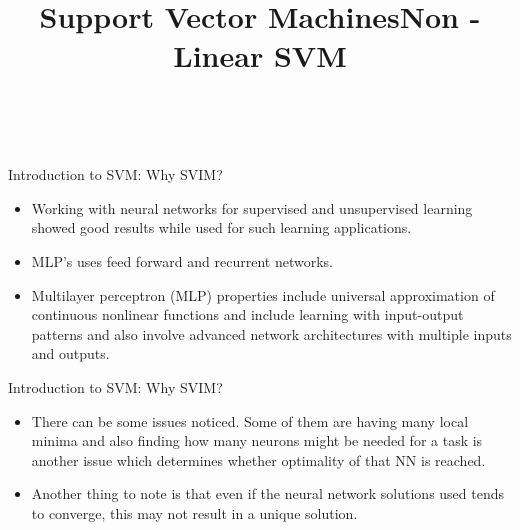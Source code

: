 \documentclass[aspectratio=169, 14pt]{beamer}
\title[Support Vector Machines]{Support Vector Machines}
\begin{document}
{\1
\begin{frame}
	\title{Non - Linear SVM}​
\titlepage
\end{frame}
}


\begin{frame}[t]{Introduction to SVM: Why SVIM?}
\begin{itemize}
\itemsep1em 
\item<2->  Working with neural networks for supervised and unsupervised learning showed good results while used for such learning applications.
\item<3->  MLP's uses feed forward and recurrent networks.
\item<4->  Multilayer perceptron (MLP) properties include universal approximation of continuous nonlinear functions and include learning with input-output patterns and also involve advanced network architectures with multiple inputs and outputs.

\end{itemize}
\end{frame}


\begin{frame}[t]{Introduction to SVM: Why SVIM?}
\begin{itemize}
\itemsep1em 
\item<2->  There can be some issues noticed. Some of them are having many local minima and also finding how many neurons might be needed for a task is another issue which determines whether optimality of that NN is reached.
\item<3->  Another thing to note is that even if the neural network solutions used tends to converge, this may not result in a unique solution.
\end{itemize}
\end{frame}
\end{document}
